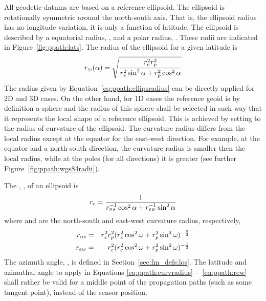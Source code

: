 \label{sec:ppath:geoid}

All geodetic datums are based on a reference ellipsoid. The ellipsoid is rotationally symmetric around the
north-south axis. That is, the ellipsoid radius has no longitude
variation, it is only a function of latitude. The ellipsoid is
described by a equatorial radius, , and a polar radius,
. These radii are indicated in Figure~\ref{fig:ppath:lats}.
The radius of the ellipsoid for a given latitude is
\begin{equation}
 r_{\odot}(\alpha) = \sqrt{\frac{r_{e}^2r_{p}^2}
                    {r_{e}^2\sin^2\alpha+r_{p}^2\cos^2\alpha}}
 \label{eq:ppath:ellipsradius} 
\end{equation}
The radius given by Equation~\ref{eq:ppath:ellipsradius} can be
directly applied for 2D and 3D cases. On the other hand, for 1D cases
the reference geoid is by definition a sphere and the radius of this
sphere shall be selected in such way that it represents the local
shape of a reference ellipsoid. This is achieved by setting
\aRds{\odot} to the radius of curvature of the ellipsoid. The
curvature radius differs from the local radius except at the equator
for the east-west direction. For example, at the equator and a
north-south direction, the curvature radius is smaller then the local
radius, while at the poles (for all directions) it is greater
(see further Figure~\ref{fig:ppath:wgs84radii}). 

The , , of an ellipsoid is 
\citep{rodgers:00}
\begin{equation}
 r_{c} = \frac{1}{r_{ns}^{-1}\cos^2 \alpha + r_{ew}^{-1}\sin^2 \alpha}
 \label{eq:ppath:curvradius} 
\end{equation}
where  and  are the north-south and east-west curvature radius, respectively,
\begin{eqnarray}
 r_{ns} &=& r_{e}^2r_{p}^2 (
           r_{e}^2\cos^2\omega+r_{p}^2\sin^2\omega )^{-\frac{3}{2}} \\
 r_{ew} &=& r_{e}^2 (
           r_{e}^2\cos^2\omega+r_{p}^2\sin^2\omega )^{-\frac{1}{2}} 
 \label{eq:ppath:rew} 
\end{eqnarray}
The azimuth angle, \AzmAng, is defined in
Section~\ref{sec:fm_defs:los}. The latitude and azimuthal angle to
apply in Equations \ref{eq:ppath:curvradius}~-~\ref{eq:ppath:rew}
shall rather be valid for a middle point of the propagation paths
(such as some tangent point), instead of the sensor position. 

